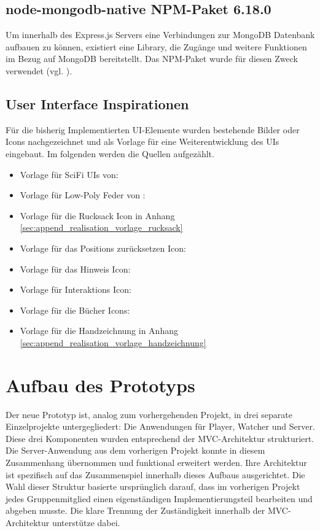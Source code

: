 \subsection{node-mongodb-native NPM-Paket 6.18.0}
Um innerhalb des Express.js Servers eine Verbindungen zur MongoDB Datenbank aufbauen zu können, existiert eine Library, die Zugänge und weitere Funktionen im Bezug auf MongoDB bereitstellt. Das \ac{NPM}-Paket  wurde für diesen Zweck verwendet (vgl. \citealp{mongodb_mongodbnode-mongodb-native_2025}).


\subsection{User Interface Inspirationen}\label{sec:user-interface-inspirations}
Für die bisherig Implementierten \ac{UI}-Elemente wurden bestehende Bilder oder Icons nachgezeichnet und als Vorlage für eine Weiterentwicklung des \ac{UI}s eingebaut. Im folgenden werden die Quellen aufgezählt.

\begin{itemize}
    \item Vorlage für SciFi \ac{UI}s von: \cite{pchvector_free_nodate}
    \item Vorlage für Low-Poly Feder von :\cite{masud_download_nodate}
    \item Vorlage für die Rucksack Icon in Anhang \ref{sec:append_realisation_vorlage_rucksack}
    \item Vorlage für das Positions zurücksetzen Icon: \cite{noauthor_chatgpt_2025}
    \item Vorlage für das Hinweis Icon: \cite{noauthor_chatgpt_2025-1}
    \item Vorlage für Interaktions Icon: \cite{noauthor_chatgpt_2024}
    \item Vorlage für die Bücher Icons: \cite{fabrica_book_nodate}
    \item Vorlage für die Handzeichnung in Anhang \ref{sec:append_realisation_vorlage_handzeichnung}
\end{itemize}

\section{Aufbau des Prototyps}

Der neue Prototyp ist, analog zum vorhergehenden Projekt, in drei separate Einzelprojekte untergegliedert: Die Anwendungen für Player, Watcher und Server. Diese drei Komponenten wurden entsprechend der \ac{MVC}-Architektur strukturiert. Die Server-Anwendung aus dem vorherigen Projekt konnte in diesem Zusammenhang übernommen und funktional erweitert werden. Ihre Architektur ist spezifisch auf das Zusammenspiel innerhalb dieses Aufbaus ausgerichtet. Die Wahl dieser Struktur basierte ursprünglich darauf, dass im vorherigen Projekt jedes Gruppenmitglied einen eigenständigen Implementierungsteil bearbeiten und abgeben musste. Die klare Trennung der Zuständigkeit innerhalb der \ac{MVC}-Architektur unterstütze dabei.

